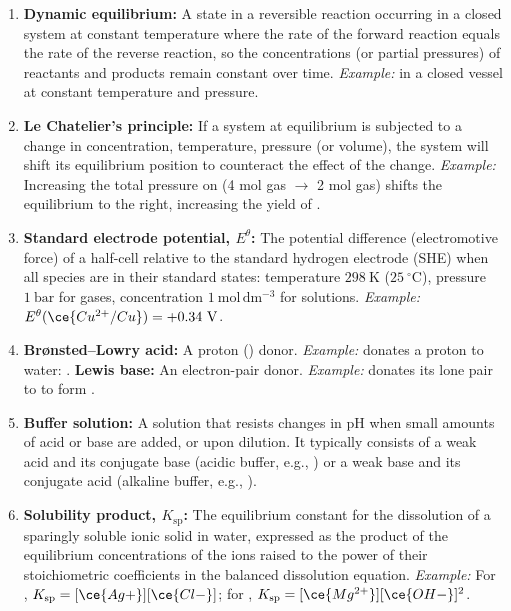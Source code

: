 \documentclass[11pt]{article}
\begin{document}
\begin{corrige}
\begin{enumerate}
\item \textbf{Dynamic equilibrium:} A state in a reversible reaction occurring in a closed system at constant temperature where the rate of the forward reaction equals the rate of the reverse reaction, so the concentrations (or partial pressures) of reactants and products remain constant over time. \emph{Example:}  in a closed vessel at constant temperature and pressure.
\item \textbf{Le Chatelier's principle:} If a system at equilibrium is subjected to a change in concentration, temperature, pressure (or volume), the system will shift its equilibrium position to counteract the effect of the change. \emph{Example:} Increasing the total pressure on  (4 mol gas $\to$ 2 mol gas) shifts the equilibrium to the right, increasing the yield of .
\item \textbf{Standard electrode potential, $E^\theta$:} The potential difference (electromotive force) of a half-cell relative to the standard hydrogen electrode (SHE) when all species are in their standard states: temperature $298\ \mathrm{K}$ ($25\ ^\circ\mathrm{C}$), pressure $1\ \mathrm{bar}$ for gases, concentration $1\ \mathrm{mol\,dm^{-3}}$ for solutions. \emph{Example:} $E^\theta(\ce{Cu^{2+}/Cu}) = +0.34\ \mathrm{V}$.
\item \textbf{Brønsted–Lowry acid:} A proton () donor. \emph{Example:}  donates a proton to water: . \textbf{Lewis base:} An electron-pair donor. \emph{Example:}  donates its lone pair to  to form .
\item \textbf{Buffer solution:} A solution that resists changes in pH when small amounts of acid or base are added, or upon dilution. It typically consists of a weak acid and its conjugate base (acidic buffer, e.g., ) or a weak base and its conjugate acid (alkaline buffer, e.g., ).
\item \textbf{Solubility product, $K_{\mathrm{sp}}$:} The equilibrium constant for the dissolution of a sparingly soluble ionic solid in water, expressed as the product of the equilibrium concentrations of the ions raised to the power of their stoichiometric coefficients in the balanced dissolution equation. \emph{Example:} For , $K_{\mathrm{sp}} = [\ce{Ag+}][\ce{Cl-}]$; for , $K_{\mathrm{sp}} = [\ce{Mg^{2+}}][\ce{OH-}]^2$.
\end{enumerate}
\end{corrige}
\end{document}
